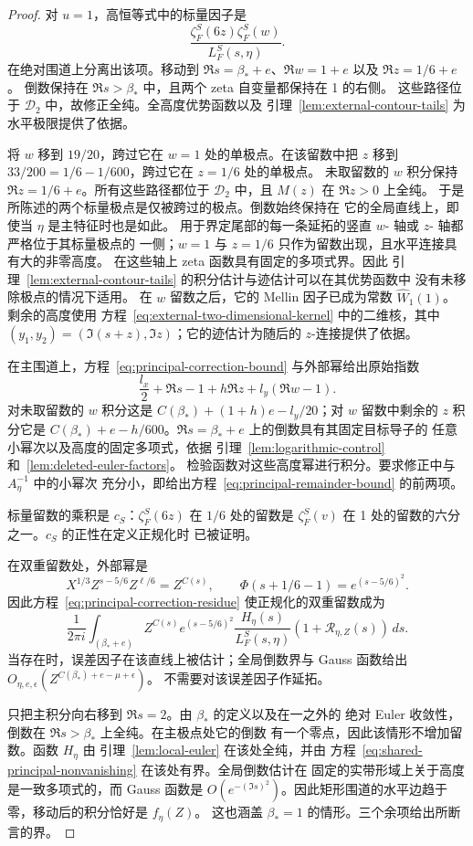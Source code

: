 \documentclass[11pt,a4paper]{article}
\numberwithin{equation}{section}
\numberwithin{figure}{section}
\theoremstyle{definition}
\theoremstyle{remark}
\begin{document}
\begin{proof}
对 $u=1$，高恒等式中的标量因子是
\[
 \frac{\zeta_F^S(6z)\zeta_F^S(w)}{L_F^S(s,\eta)}.
\]
在绝对围道上分离出该项。移动到
$\Re s=\beta_*+e$、$\Re w=1+e$ 以及 $\Re z=1/6+e$。
倒数保持在 $\Re s>\beta_*$ 中，且两个 zeta 自变量都保持在 1 的右侧。
这些路径位于 $\mathcal D_2$ 中，故修正全纯。全高度优势函数以及
引理~\ref{lem:external-contour-tails} 为水平极限提供了依据。

将 $w$ 移到 $19/20$，跨过它在 $w=1$ 处的单极点。在该留数中把 $z$ 移到
$33/200=1/6-1/600$，跨过它在 $z=1/6$ 处的单极点。
未取留数的 $w$ 积分保持 $\Re z=1/6+e$。所有这些路径都位于
$\mathcal D_2$ 中，且 $M(z)$ 在 $\Re z>0$ 上全纯。
于是所陈述的两个标量极点是仅被跨过的极点。倒数始终保持在
它的全局直线上，即使当 $\eta$ 是主特征时也是如此。
用于界定尾部的每一条延拓的竖直 $w$- 轴或 $z$- 轴都严格位于其标量极点的
一侧；$w=1$ 与 $z=1/6$ 只作为留数出现，且水平连接具有大的非零高度。
在这些轴上 zeta 函数具有固定的多项式界。因此
引理~\ref{lem:external-contour-tails} 的积分估计与迹估计可以在其优势函数中
没有未移除极点的情况下适用。
在 $w$ 留数之后，它的 Mellin 因子已成为常数
$\widehat W_1(1)$。剩余的高度使用
方程~\eqref{eq:external-two-dimensional-kernel} 中的二维核，其中
$(y_1,y_2)=(\Im(s+z),\Im z)$；它的迹估计为随后的 $z$-连接提供了依据。

在主围道上，方程~\eqref{eq:principal-correction-bound} 与外部幂给出原始指数
\[
 \frac{l_x}{2}+\Re s-1+h\Re z+l_y(\Re w-1).
\]
对未取留数的 $w$ 积分这是
$C(\beta_*)+(1+h)e-l_y/20$；对 $w$ 留数中剩余的 $z$ 积分它是
$C(\beta_*)+e-h/600$。$\Re s=\beta_*+e$ 上的倒数具有其固定目标导子的
任意小幂次以及高度的固定多项式，依据
引理~\ref{lem:logarithmic-control} 和~\ref{lem:deleted-euler-factors}。
检验函数对这些高度幂进行积分。要求修正中与 $A_\eta^{-1}$ 中的小幂次
充分小，即给出方程~\eqref{eq:principal-remainder-bound} 的前两项。

标量留数的乘积是 $c_S$：$\zeta_F^S(6z)$ 在 $1/6$ 处的留数是
$\zeta_F^S(v)$ 在 1 处的留数的六分之一。$c_S$ 的正性在定义正规化时
已被证明。

在双重留数处，外部幂是
\[
 X^{1/3}Z^{s-5/6}Z^{\ell/6}=Z^{C(s)},
 \qquad \Phi(s+1/6-1)=e^{(s-5/6)^2}.
\]
因此方程~\eqref{eq:principal-correction-residue} 使正规化的双重留数成为
\[
 \frac1{2\pi i}\int_{(\beta_*+e)}
 Z^{C(s)}e^{(s-5/6)^2}\frac{H_\eta(s)}{L_F^S(s,\eta)}
          (1+\mathcal R_{\eta,Z}(s))\,ds.
\]
当存在时，误差因子在该直线上被估计；全局倒数界与 Gauss 函数给出
$O_{\eta,e,\epsilon}(Z^{C(\beta_*)+e-\mu+\epsilon})$。
不需要对该误差因子作延拓。

只把主积分向右移到 $\Re s=2$。由 $\beta_*$ 的定义以及在一之外的
绝对 Euler 收敛性，倒数在 $\Re s>\beta_*$ 上全纯。在主极点处它的倒数
有一个零点，因此该情形不增加留数。函数 $H_\eta$ 由
引理~\ref{lem:local-euler} 在该处全纯，并由
方程~\eqref{eq:shared-principal-nonvanishing} 在该处有界。全局倒数估计在
固定的实带形域上关于高度是一致多项式的，而 Gauss 函数是
$O(e^{-(\Im s)^2})$。因此矩形围道的水平边趋于零，移动后的积分恰好是
$f_\eta(Z)$。
这也涵盖 $\beta_*=1$ 的情形。三个余项给出所断言的界。
\end{proof}
\end{document}
